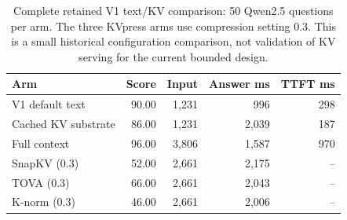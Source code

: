 \begin{table}[htbp]
\centering
\scriptsize
\setlength{\tabcolsep}{4pt}
\caption{Complete retained V1 text/KV comparison: 50 Qwen2.5 questions per arm. The three KVpress arms use compression setting 0.3. This is a small historical configuration comparison, not validation of KV serving for the current bounded design.}
\label{tab:legacy-kv}
\begin{tabular}{lrrrr}
\toprule
Arm & Score & Input & Answer ms & TTFT ms \\
\midrule
V1 default text & 90.00 & 1,231 & 996 & 298 \\
Cached KV substrate & 86.00 & 1,231 & 2,039 & 187 \\
Full context & 96.00 & 3,806 & 1,587 & 970 \\
SnapKV (0.3) & 52.00 & 2,661 & 2,175 & -- \\
TOVA (0.3) & 66.00 & 2,661 & 2,043 & -- \\
K-norm (0.3) & 46.00 & 2,661 & 2,006 & -- \\
\bottomrule
\end{tabular}
\end{table}
